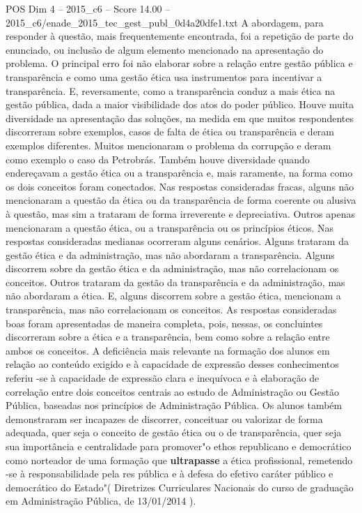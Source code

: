 \begin{textsample}{POS Dim 4 – 2015\_c6 – Score 14.00 – 2015\_c6/enade\_2015\_tec\_gest\_publ\_0d4a20dfe1.txt}
A abordagem, para responder à questão, mais frequentemente encontrada, foi a repetição de parte do enunciado, ou inclusão de algum elemento mencionado na apresentação do problema.
O principal erro foi não elaborar sobre a relação entre gestão pública e transparência e como uma gestão ética usa instrumentos para incentivar a transparência.
E, reversamente, como a transparência conduz a mais ética na gestão pública, dada a maior visibilidade dos atos do poder público.
Houve muita diversidade na apresentação das soluções, na medida em que muitos respondentes discorreram sobre exemplos, casos de falta de ética ou transparência e deram exemplos diferentes.
Muitos mencionaram o problema da corrupção e deram como exemplo o caso da Petrobrás.
Também houve diversidade quando endereçavam a gestão ética ou a transparência e, mais raramente, na forma como os dois conceitos foram conectados.
Nas respostas consideradas fracas, alguns não mencionaram a questão da ética ou da transparência de forma coerente ou alusiva à questão, mas sim a trataram de forma irreverente e depreciativa.
Outros apenas mencionaram a questão ética, ou a transparência ou os princípios éticos.
Nas respostas consideradas medianas ocorreram alguns cenários.
Alguns trataram da gestão ética e da administração, mas não abordaram a transparência.
Alguns discorrem sobre da gestão ética e da administração, mas não correlacionam os conceitos.
Outros trataram da gestão da transparência e da administração, mas não abordaram a ética.
E, alguns discorrem sobre a gestão ética, mencionam a transparência, mas não correlacionam os conceitos.
As respostas consideradas boas foram apresentadas de maneira completa, pois, nessas, os concluintes discorreram sobre a ética e a transparência, bem como sobre a relação entre ambos os conceitos.
A deficiência mais relevante na formação dos alunos em relação ao conteúdo exigido e à capacidade de expressão desses conhecimentos referiu -se à capacidade de expressão clara e inequívoca e à elaboração de correlação entre dois conceitos centrais ao estudo de Administração ou Gestão Pública, baseadas nos princípios de Administração Pública.
Os alunos também demonstraram ser incapazes de discorrer, conceituar ou valorizar de forma adequada, quer seja o conceito de gestão ética ou o de transparência, quer seja sua importância e centralidade para promover"o ethos republicano e democrático como norteador de uma formação que \textbf{ultrapasse} a ética profissional, remetendo -se à responsabilidade pela res pública e à defesa do efetivo caráter público e democrático do Estado"( Diretrizes Curriculares Nacionais do curso de graduação em Administração Pública, de 13/01/2014 ).

\end{textsample}
